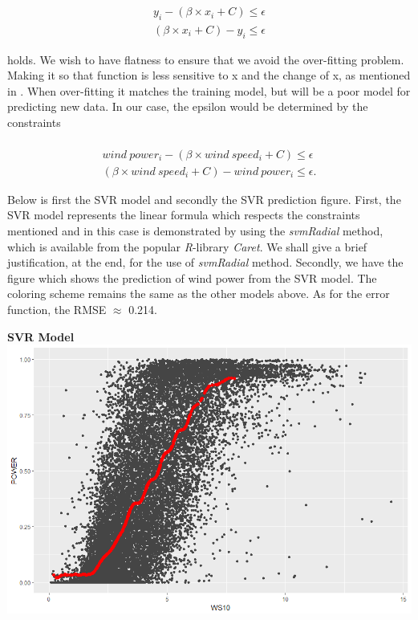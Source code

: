 \documentclass[
11pt, %
english, %
singlespacing, %
parskip, %
headsepline, %
]{report} %
\begin{document}
    \begin{align*}\\[-1cm]
        y_{i} - (\beta \times x_{i} + C) \leq \epsilon \\
        (\beta \times  x_{i} + C) - y_{i} \leq \epsilon
    \end{align*}
    
     
    holds. We wish to have flatness to ensure that we avoid the over-fitting problem. Making it so that function is less sensitive to x and the change of x, as mentioned in \cite{svmForm}. When over-fitting it matches the training model, but will be a poor model for predicting new data. In our case, the epsilon would be determined by the constraints
    
    \begin{align*}\\[-1cm]
        wind\ power_{i} - (\beta \times wind\ speed_{i} + C) \leq \epsilon \\
        (\beta \times wind\ speed_{i} + C) - wind\ power_{i} \leq \epsilon .
    \end{align*}
    
    Below is first the SVR model and secondly the SVR prediction figure. First, the SVR model represents the linear formula which respects the constraints mentioned and in this case is demonstrated by using the \emph{svmRadial} method, which is available from the popular \emph{R}-library \emph{Caret}. We shall give a brief justification, at the end, for the use of \emph{svmRadial} method. Secondly, we have the figure which shows the prediction of wind power from the SVR model. The coloring scheme remains the same as the other models above. As for the error function, the RMSE $\approx$ 0.214.

\newpage

    \begin{center}
        \textbf{SVR Model}\\
    	\includegraphics[scale=0.3, width=\textwidth]{figures/Rplot_SVR_model.png}\\[1cm]    
    \end{center}
    
\end{document}
